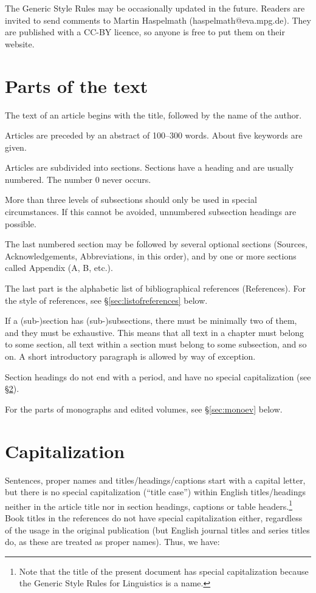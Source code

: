 \documentclass[a4paper]{article}
\newcommand{\sectref}[1]{§\ref{#1}}
\newcommand{\gsrex}[1]{{\color{blue}#1}}
\begin{document}
The Generic Style Rules may be occasionally updated in the
future. Readers are invited to send comments to Martin Haspelmath
(haspelmath@eva.mpg.de). They are published with a CC-BY licence, so
anyone is free to put them on their website.

\section{Parts of the text}\label{sec:parts}

The text of an article begins with the title, followed by the name of
the author. 

Articles are preceded by an abstract of 100--300 words. About five keywords are given. 

Articles are subdivided into sections.
Sections have a heading and are usually numbered. The number 0 never
occurs. 

More than three levels of subsections should only be used in
special circumstances. If this cannot be avoided, unnumbered subsection
headings are possible. 

The last numbered section may be followed by
several optional sections (\gsrex{Sources},
\gsrex{Acknowledgements},
\gsrex{Abbreviations},
in this order), and by one or more sections called \gsrex{Appendix} (A, B, etc.).


The last part is the alphabetic list of bibliographical references
(\gsrex{References}). For the style of references, see \sectref{sec:listofreferences} below. 

If a
(sub-)section has (sub-)subsections, there must be minimally two of
them, and they must be exhaustive. This means that all text in a chapter
must belong to some section, all text within a section must belong to
some subsection, and so on. A short introductory paragraph is allowed by
way of exception. 

Section headings do not end with a period, and have no
special capitalization (see \sectref{sec:capitalization}). 

For the parts of monographs and edited
volumes, see \sectref{sec:monoev} below.

\section{Capitalization}\label{sec:capitalization}

Sentences, proper names and titles/headings/captions start with a
capital letter, but there is no special capitalization (``title case'')
within English titles/headings neither in the article title nor in
section headings, captions or table headers.\footnote{Note that the title
of the present document has special capitalization because the Generic
Style Rules for Linguistics is a name.} Book titles in the references
do not have special capitalization either, regardless of the usage in
the original publication (but English journal titles and series titles
do, as these are treated as proper names). Thus, we have:
\end{document}

